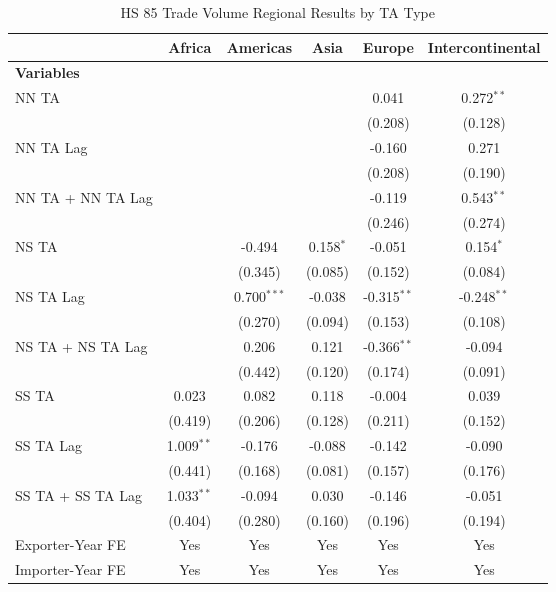 \begin{table}[htbp]
    \centering
    \caption{HS 85 Trade Volume Regional Results by TA Type}
    \label{tab:85_trade_pta_types}
    \begin{adjustbox}{max width=\textwidth}
    \begin{tabular}{lccccc}
    \hline
     & \multicolumn{1}{c}{Africa} & \multicolumn{1}{c}{Americas} & \multicolumn{1}{c}{Asia} & \multicolumn{1}{c}{Europe} & \multicolumn{1}{c}{Intercontinental} \\
    \hline
    \textbf{Variables} &  &  &  &  &  \\
    \hline
    NN TA &  &  &  & 0.041 & 0.272$^{\ast\ast}$ \\
     &  &  &  & (0.208) & (0.128) \\
    NN TA Lag &  &  &  & -0.160 & 0.271 \\
     &  &  &  & (0.208) & (0.190) \\
    NN TA + NN TA Lag &  &  &  & -0.119 & 0.543$^{\ast\ast}$ \\
     &  &  &  & (0.246) & (0.274) \\
    \hline
    NS TA &  & -0.494 & 0.158$^{\ast}$ & -0.051 & 0.154$^{\ast}$ \\
     &  & (0.345) & (0.085) & (0.152) & (0.084) \\
    NS TA Lag &  & 0.700$^{\ast\ast\ast}$ & -0.038 & -0.315$^{\ast\ast}$ & -0.248$^{\ast\ast}$ \\
     &  & (0.270) & (0.094) & (0.153) & (0.108) \\
    NS TA + NS TA Lag &  & 0.206 & 0.121 & -0.366$^{\ast\ast}$ & -0.094 \\
     &  & (0.442) & (0.120) & (0.174) & (0.091) \\
    \hline
    SS TA & 0.023 & 0.082 & 0.118 & -0.004 & 0.039 \\
     & (0.419) & (0.206) & (0.128) & (0.211) & (0.152) \\
    SS TA Lag & 1.009$^{\ast\ast}$ & -0.176 & -0.088 & -0.142 & -0.090 \\
     & (0.441) & (0.168) & (0.081) & (0.157) & (0.176) \\
    SS TA + SS TA Lag & 1.033$^{\ast\ast}$ & -0.094 & 0.030 & -0.146 & -0.051 \\
     & (0.404) & (0.280) & (0.160) & (0.196) & (0.194) \\
    \hline
    Exporter-Year FE & Yes & Yes & Yes & Yes & Yes \\
    Importer-Year FE & Yes & Yes & Yes & Yes & Yes \\

\end{tabular}
\end{adjustbox}
\end{table}
